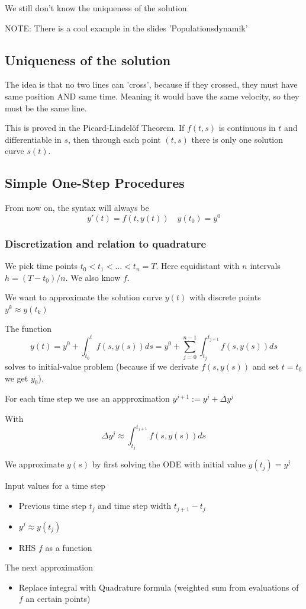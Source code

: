 \documentclass{article}
\begin{document}
We still don't know the uniqueness of the solution

NOTE: There is a cool example in the slides 'Populationsdynamik'

\subsection{Uniqueness of the solution}
The idea is that no two lines can 'cross', because if they crossed, they must have same position AND same time. Meaning it would have the same velocity, so they must be the same line.

This is proved in the Picard-Lindelöf Theorem. If $f(t,s)$ is continuous in $t$ and differentiable in $s$, then through each point $(t,s)$ there is only one solution curve $s(t)$.

\subsection{Simple One-Step Procedures}
From now on, the syntax will always be
\[y'(t) = f(t,y(t)) \quad y(t_0) = y^0\]

\subsubsection{Discretization and relation to quadrature}
We pick time points $t_0 < t_1 < ... < t_n = T$. Here equidistant with $n$ intervals $h = (T-t_0)/n$. We also know $f$.

We want to approximate the solution curve $y(t)$ with discrete points $y^k \approx y(t_k)$

The function
\[y(t) = y^0 + \int_{t_0}^t f(s,y(s))ds = y^0 + \sum_{j=0}^{n-1}\int_{t_j}^{t_{j+1}}f(s,y(s))ds\]
solves to initial-value problem (because if we derivate $f(s,y(s))$ and set $t=t_0$ we get $y_0$).

For each time step we use an appproximation $y^{j+1} := y^j + \Delta y^j$

With
\[\Delta y^j \approx \int_{t_j}^{t_{j+1}}f(s,y(s))ds\]

We approximate $y(s)$ by first solving the ODE with initial value  $y(t_j) = y^j$

Input values for a time step
\begin{itemize}
  \item Previous time step $t_j$ and time step width $t_{j+1} - t_j$
  \item $y^j \approx y(t_j)$
  \item RHS $f$ as a function 
\end{itemize}
The next approximation
\begin{itemize}
  \item Replace integral with Quadrature formula (weighted sum from evaluations of $f$ an certain points)
\end{itemize}
\end{document}
